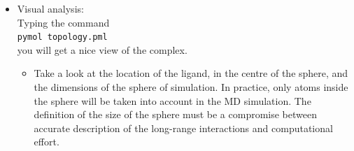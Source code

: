 \documentclass[a4paper,12pt]{article}
\newcommand{\qprep}{\texttt{qprep5}}
\begin{document}
\begin {itemize}
\begin {itemize}
    \item {\texttt { readprm ../FF{\_}Q/Qoplsaa.prm}}
    \item {\texttt { readpdb complex.pdb}}
    \item {\texttt { addbond 5480 6383 y}} (to form the bond between the Fe atom and the S of Cys 348; 
        "y" indicates that we accept the 2.2 {\AA} bond length. Note, that the atom numbers forming the bond can be found by typing
         {\texttt { listseq}} to see the sequence and {\texttt { listres}} to see the atom numbers in a given residue)
    \item {\texttt {boundary sphere 407:C1 18}} (the centre of the 18 {\AA} radius sphere of simulation will be the central atom of the ligand, indicated by residue:atom{\_}name)
    \item {\texttt {solvate 407:C1 18 1 HOH}} (solvate with TIP3P waters the sphere of simulation)
    \item {\texttt {maketop "cma compex topology"}} (make the topology, giving a title for it)
    \item {\texttt {writetop cma.top}}
    \item {\texttt {writepdb cma{\_}top.pdb y}} (we will have a pdb of the starting coordinates of the system; "y" indicates write GAP between molecules)
    \item {\texttt {quit}}
    \end {itemize}
We have generated the topology file, \texttt{cma.top}, which will be the file used as input for the MD simulation.\\
Alternatively you can write all {\qprep} commands in a separate
file ({\it e.g.} \texttt{maketop.inp} and run {\qprep} {\texttt {<
maketop.inp > maketop.log}}, so you can carefully analyze the
output given by the program.

\item Visual analysis: \\
Typing the command \\
\texttt{pymol topology.pml} \\
you will get a nice view of the complex.
\begin {itemize}
\item Take a look at the location of the ligand, in the centre of the sphere, and the dimensions of the sphere of simulation. In practice, only atoms inside the sphere will be taken into account in the MD simulation. The definition of the size of the sphere must be a compromise between accurate description of the long-range interactions and computational effort.
\end {itemize}
\end {itemize}
\end{document}

